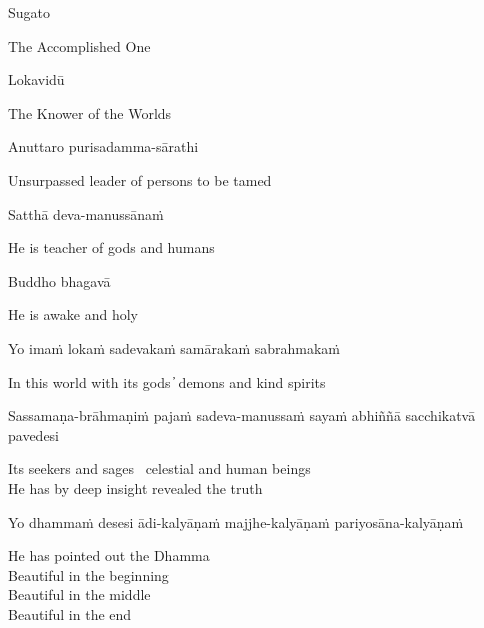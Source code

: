 Sugato

\begin{english}
  The Accomplished One
\end{english}

Lokavidū

\begin{english}
  The Knower of the Worlds
\end{english}

Anuttaro purisadamma-sārathi

\begin{english}
  Unsurpassed leader of persons to be tamed
\end{english}

Satthā deva-manussānaṁ

\begin{english}
  He is teacher of gods and humans
\end{english}

Buddho bhagavā

\begin{english}
  He is awake and holy
\end{english}

Yo imaṁ lokaṁ sadevakaṁ samārakaṁ sabrahmakaṁ

\begin{english}
  In this world with its gods ̓ demons and kind spirits
\end{english}

\begin{pali-hang}
  Sassamaṇa-brāhmaṇiṁ pajaṁ sadeva-manussaṁ sayaṁ abhiññā sacchikatvā pavedesi
\end{pali-hang}

\begin{english}
  Its seekers and sages \breathmark\ celestial and human beings\\
  He has by deep insight revealed the truth
\end{english}

\begin{pali-hang}
Yo dhammaṁ desesi ādi-kalyāṇaṁ majjhe-kalyāṇaṁ pariyosāna-kalyāṇaṁ
\end{pali-hang}

\begin{english}
  He has pointed out the Dhamma\\
  Beautiful in the beginning\\
  Beautiful in the middle\\
  Beautiful in the end\\
\end{english}

